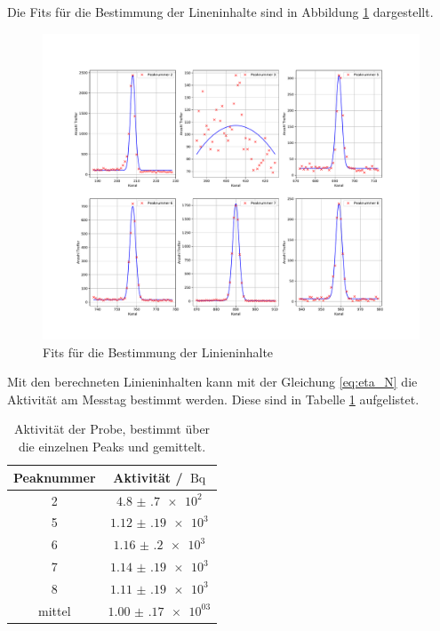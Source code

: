 \FloatBarrier
Die Fits für die Bestimmung der Lineninhalte sind in Abbildung \ref{fig:Linieninhalt_03} dargestellt.
\FloatBarrier
\begin{figure}
  \centering
  \includegraphics[width=\textwidth,keepaspectratio]{figure/03_subplot.pdf}
  \caption{Fits für die Bestimmung der Linieninhalte}
  \label{fig:Linieninhalt_03}
\end{figure}
Mit den berechneten Linieninhalten kann mit der Gleichung \eqref{eq:eta_N} die Aktivität am Messtag bestimmt werden. 
Diese sind in Tabelle \ref{tab:Akti_03} aufgelistet.
\FloatBarrier
\begin{table}
  \centering
  \caption{Aktivität der  Probe, bestimmt über die einzelnen Peaks und gemittelt.}
  \label{tab:Akti_03}
  \begin{tabular}{c c}
    \toprule
    Peaknummer & Aktivität / $\SI{}{\becquerel}$\\
    \midrule
    2&$\num{4.8(7)e+2}$\\
    5&$\num{1.12(19)e+3}$\\
    6&$\num{1.16(20)e+3}$\\
    7&$\num{1.14(19)e+3}$\\
    8&$\num{1.11(19)e+3}$\\
    \midrule
    mittel& $\num{1.00(17)e+03}$\\
    \bottomrule
  \end{tabular}
\end{table}
